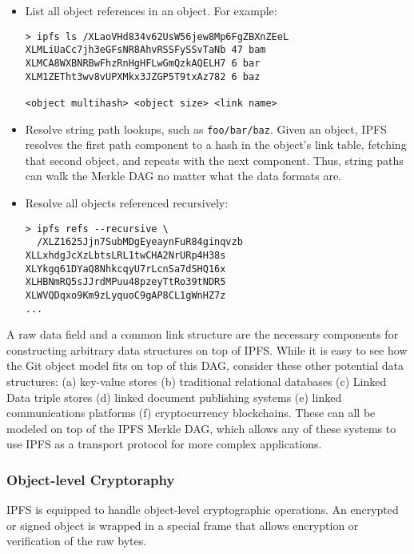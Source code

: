 \documentclass{sig-alternate}
\begin{document}
\begin{itemize}

  \item List all object references in an object. For example:
\begin{verbatim}
> ipfs ls /XLaoVHd834v62UsW56jew8Mp6FgZBXnZEeL
XLMLiUaCc7jh3eGFsNR8AhvRSSFySSvTaNb 47 bam
XLMCA8WXBNRBwFhzRnHgHFLwGmQzkAQELH7 6 bar
XLM1ZETht3wv8vUPXMkx3JZGP5T9txAz782 6 baz

<object multihash> <object size> <link name>
\end{verbatim}

  \item Resolve string path lookups, such as \texttt{foo/bar/baz}. Given an object, IPFS resolves the first path component to a hash in the object's link table, fetching that second object, and repeats with the next component. Thus, string paths can walk the Merkle DAG no matter what the data formats are.

  \item Resolve all objects referenced recursively:
\begin{verbatim}
> ipfs refs --recursive \
  /XLZ1625Jjn7SubMDgEyeaynFuR84ginqvzb
XLLxhdgJcXzLbtsLRL1twCHA2NrURp4H38s
XLYkgq61DYaQ8NhkcqyU7rLcnSa7dSHQ16x
XLHBNmRQ5sJJrdMPuu48pzeyTtRo39tNDR5
XLWVQDqxo9Km9zLyquoC9gAP8CL1gWnHZ7z
...
\end{verbatim}

\end{itemize}


A raw data field and a common link structure are the necessary components for constructing arbitrary data structures on top of IPFS. While it is easy to see how the Git object model fits on top of this DAG, consider these other potential data structures:
(a) key-value stores
(b) traditional relational databases
(c) Linked Data triple stores
(d) linked document publishing systems
(e) linked communications platforms
(f) cryptocurrency blockchains.
These can all be modeled on top of the IPFS Merkle DAG, which allows any of these systems to use IPFS as a transport protocol for more complex applications.

\subsubsection{Object-level Cryptoraphy}

IPFS is equipped to handle object-level cryptographic operations. An encrypted or signed object is wrapped in a special frame that allows encryption or verification of the raw bytes.
\end{document}
